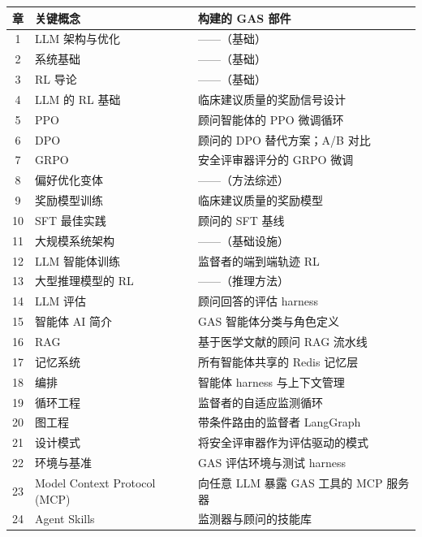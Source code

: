 \documentclass[11pt,a4paper,openany]{book}
\begin{document}
\begin{table}[ht!]
\centering
\small
\begin{tabular}{clp{6.5cm}}
\hline
\textbf{章} & \textbf{关键概念} & \textbf{构建的 GAS 部件} \\
\hline
1  & LLM 架构与优化   & ——（基础） \\
2  & 系统基础                & ——（基础） \\
3  & RL 导论                 & ——（基础） \\
4  & LLM 的 RL 基础            & 临床建议质量的奖励信号设计 \\
5  & PPO                                & 顾问智能体的 PPO 微调循环 \\
6  & DPO                                & 顾问的 DPO 替代方案；A/B 对比 \\
7  & GRPO                               & 安全评审器评分的 GRPO 微调 \\
8  & 偏好优化变体   & ——（方法综述） \\
9  & 奖励模型训练              & 临床建议质量的奖励模型 \\
10 & SFT 最佳实践                 & 顾问的 SFT 基线 \\
11 & 大规模系统架构       & ——（基础设施） \\
12 & LLM 智能体训练               & 监督者的端到端轨迹 RL \\
13 & 大型推理模型的 RL      & ——（推理方法） \\
14 & LLM 评估                     & 顾问回答的评估 harness \\
15 & 智能体 AI 简介         & GAS 智能体分类与角色定义 \\
16 & RAG                                & 基于医学文献的顾问 RAG 流水线 \\
17 & 记忆系统                     & 所有智能体共享的 Redis 记忆层 \\
18 & 编排                      & 智能体 harness 与上下文管理 \\
19 & 循环工程               & 监督者的自适应监测循环 \\
20 & 图工程                  & 带条件路由的监督者 LangGraph \\
21 & 设计模式                    & 将安全评审器作为评估驱动的模式 \\
22 & 环境与基准         & GAS 评估环境与测试 harness \\
23 & Model Context Protocol (MCP)       & 向任意 LLM 暴露 GAS 工具的 MCP 服务器 \\
24 & Agent Skills                       & 监测器与顾问的技能库 \\

\end{tabular}
\end{table}
\end{document}
